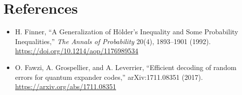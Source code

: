 \documentclass[11pt]{article}
\newcommand{\1}{\mathbf 1}
\begin{document}
\section*{References}

\begin{itemize}
\item H. Finner, ``A Generalization of H\"older's Inequality and Some
Probability Inequalities,'' \emph{The Annals of Probability} 20(4),
1893--1901 (1992).
\url{https://doi.org/10.1214/aop/1176989534}
\item O. Fawzi, A. Grospellier, and A. Leverrier, ``Efficient decoding of
random errors for quantum expander codes,'' arXiv:1711.08351 (2017).
\url{https://arxiv.org/abs/1711.08351}
\end{itemize}
\end{document}

